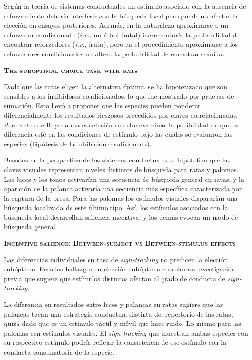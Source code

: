 \documentclass[a4paper,12pt]{article}
\begin{document}
Según la teoría de sistemas conductuales un estímulo asociado con la ausencia de reforzamiento debería interferir con la búsqueda focal pero puede no afectar la elección en ensayos posteriores. Además, en la naturaleza aproximarse a un reforzador condicionado ({\itshape i.e.,} un árbol frutal) incrementaría la probabilidad de encontrar reforzadores ({\itshape i.r.,} fruta), pero en el procedimiento aproximarse a los reforzadores condicionados no altera la probabilidad de encontrar comida.

{\scshape\bfseries The suboptimal choice task with rats}

Dado que las ratas eligen la alternativa óptima, se ha hipotetizado que son sensibles a los inhibidores condicionados, lo que fue mostrado por pruebas de sumación. Esto llevó a proponer que las especies pueden ponderar diferencialmente los resultados riesgosos precedidos por claves correlacionadas. Pero antes de llegar a esa conclusión se debe examinar la posibilidad de que la diferencia esté en las condiciones de estímulo bajo las cuáles se evaluaron las especies (hipótesis de la inhibición condicionada).

Basados en la perspectiva de los sistemas conductuales se hipotetiza que las claves visuales representan niveles distintos de búsqueda para ratas y palomas. Las luces y los tonos activarían una secuencia de búsqueda general en ratas, y la aparición de la palanca activaría una secuencia más específica caracterizada por la captura de la presa. Para las palomas los estímulos visuales dispararían una búsqueda focalizada de este último tipo. Así, los estímulos asociados con la búsqueda focal desarrollan saliencia incentiva, y los demás evocan un modo de búsqueda general.

{\scshape\bfseries Incentive salience: Between-subject vs Between-stimulus effects}

Las diferencias individuales en tasa de {\itshape sign-tracking} no predicen la elección subóptima. Pero los hallazgos en elección subóptima corroboran investigación previa que sugiere que estímulos distintos afectan al grado de conducta de {\itshape sign-tracking}.

La diferencia en resultados entre luces y palancas en ratas sugiere que las palancas tocan una estrategia conductual distinta del repertorio de las ratas, quizá dado que es un estímulo táctil y móvil que hace ruido. Lo mismo para las palomas con estímulos visuales. El {\itshape sign-tracking} que muestran ambas especies con su respectivo estímulo podría reflejar la consistencia de ese estímulo con la conducta consumatoria de la especie.
\end{document}
